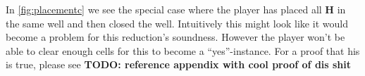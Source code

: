 In \autoref{fig:placementc} we see the special case where the player has placed all $\mathbf{H}$ in the same well and then closed the well. Intuitively this might look like it would become a problem for this reduction's soundness. However the player won't be able to clear enough cells for this to become a ``yes''-instance. For a proof that his is true, please see \textbf{TODO: reference appendix with cool proof of dis shit}
